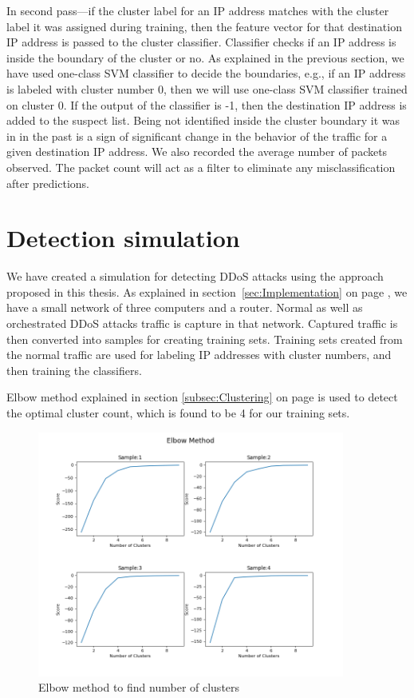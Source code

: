 \documentclass[12pt,oneside,a4paper]{article}
\begin{document}
In second pass---if the cluster label for an IP address matches with the cluster label it was assigned during training, then the feature vector for that destination IP address is passed to the cluster classifier. Classifier checks if an IP address is inside the boundary of the cluster or no. As explained in the previous section, we have used one-class SVM classifier to decide the boundaries, e.g., if an IP address is labeled with cluster number 0, then we will use one-class SVM classifier trained on cluster 0. If the output of the classifier is -1, then the destination IP address is added to the suspect list. Being not identified inside the cluster boundary it was in in the past is a sign of significant change in the behavior of the traffic for a given destination IP address. We also recorded the average number of packets observed. The packet count will act as a filter to eliminate any misclassification after predictions.
\pagebreak
\section{Detection simulation}

We have created a simulation for detecting DDoS attacks using the approach proposed in this thesis. As explained in section~\ref{sec:Implementation} on page \pageref{sec:Implementation}, we have a small network of three computers and a router. Normal as well as orchestrated DDoS attacks traffic is capture in that network. Captured traffic is then converted into samples for creating training sets. Training sets created from the normal traffic are used for labeling IP addresses with cluster numbers, and then training the classifiers.

Elbow method explained in section \ref{subsec:Clustering} on page \pageref{subsec:Clustering} is used to detect the optimal cluster count, which is found to be 4 for our training sets.

\begin{figure}[H]
\centering
\includegraphics[width=0.90\textwidth]{elbow-method-applied.png}
\caption{Elbow method to find number of clusters}
\label{fig:elbow-method-applied}
\end{figure}
\end{document}
